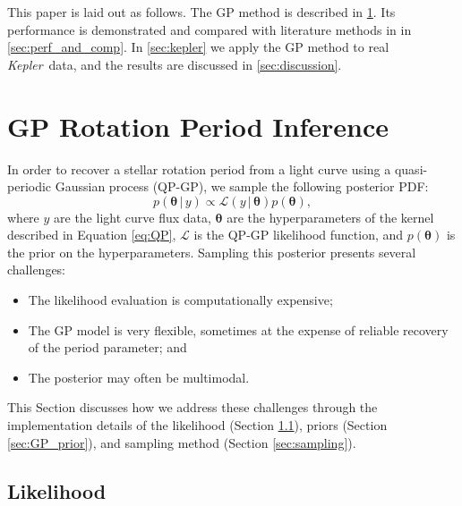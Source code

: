 \documentclass[a4paper,fleqn,usenatbib,useAMS]{mnras}
\newcommand{\Kepler}{{\it Kepler}}
\newcommand{\kepler}{\Kepler}
\begin{document}
This paper is laid out as follows.
The GP method is described in \textsection \ref{sec:method}.
Its performance is demonstrated and compared with literature methods in
in \textsection \ref{sec:perf_and_comp}.
In \textsection \ref{sec:kepler} we apply the GP method to real \kepler\ data,
and the results are discussed in \textsection \ref{sec:discussion}.

\section{GP Rotation Period Inference}
\label{sec:method}

In order to recover a stellar rotation period from a light curve using a
quasi-periodic Gaussian process (QP-GP), we sample the following posterior
PDF:
\begin{equation}
\label{eq:posterior}
p({\bm \theta}\,|\,y) \propto \mathcal L(y\,|\,{\bm \theta}) p({\bm \theta}),
\end{equation}
where $y$ are the light curve flux data, $\bm \theta$ are the hyperparameters
of the kernel described in Equation \ref{eq:QP}, $\mathcal L$ is the
QP-GP likelihood function, and $p({\bm \theta})$ is the prior on the
hyperparameters.  Sampling this posterior presents several challenges:
\begin{itemize}
    \item The likelihood evaluation is computationally expensive;
    \item The GP model is very flexible, sometimes at the expense of
    reliable recovery of the period parameter; and
    \item The posterior may often be multimodal.
\end{itemize}
This Section discusses how we address these challenges through
the implementation details of the likelihood (Section \ref{sec:GP_lhood}), priors
(Section \ref{sec:GP_prior}), and sampling method (Section \ref{sec:sampling}).

\subsection{Likelihood}
\label{sec:GP_lhood}
\end{document}
